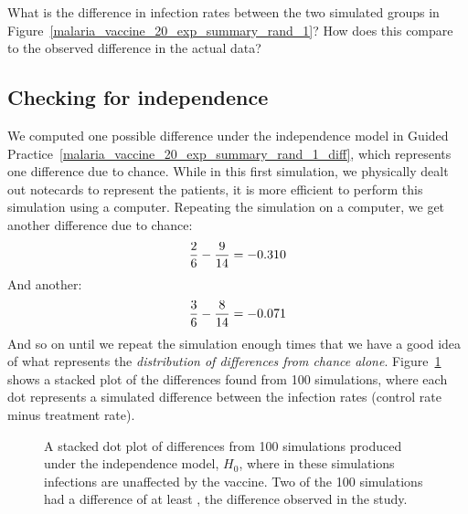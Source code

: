 \begin{exercisewrap}
\begin{nexercise}
\label{malaria_vaccine_20_exp_summary_rand_1_diff}
What is the difference in infection rates between
the two simulated groups in
Figure~\ref{malaria_vaccine_20_exp_summary_rand_1}?
How does this compare to the observed
\malariaIRDiffPerc{} difference
in the actual data?\footnotemark{}
\end{nexercise}
\end{exercisewrap}


\subsection{Checking for independence}

We computed one possible difference under the
independence model in Guided
Practice~\ref{malaria_vaccine_20_exp_summary_rand_1_diff},
which represents one difference due to chance.
While in this first simulation, we physically dealt
out notecards to represent the patients,
it is more efficient to perform this simulation
using a computer.
Repeating the simulation on a computer, we get another
difference due to chance:
\begin{align*}
\frac{2}{6{}} - \frac{9}{14{}} = -0.310
\end{align*}
And another:
\begin{align*}
\frac{3}{6{}} - \frac{8}{14{}} = -0.071
\end{align*}
And so on until we repeat the simulation enough times
that we have a good idea of what represents the
\emph{distribution of differences from chance alone}.
Figure~\ref{malaria_rand_dot_plot} shows a stacked plot
of the differences found from 100 simulations,
where each dot represents a simulated difference between
the infection rates (control rate minus treatment rate).

\begin{figure}[ht]
  \centering
  \caption{A stacked dot plot of differences from
      100 simulations produced under the independence model,
      $H_0$, where in these simulations infections are
      unaffected by the vaccine.
      Two of the 100 simulations had a difference of
      at least \malariaIRDiffPerc{}, the difference observed
      in the study.}
  \label{malaria_rand_dot_plot}
\end{figure}

